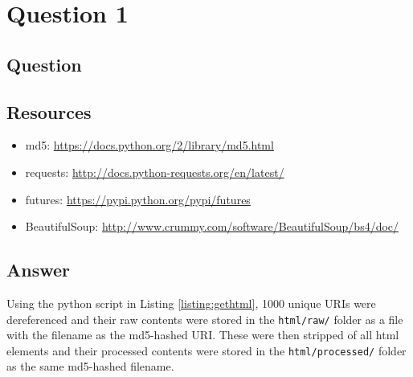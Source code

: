 \section{Question 1}

\subsection{Question}


\subsection{Resources}
\begin{itemize}
\item md5: \url{https://docs.python.org/2/library/md5.html}
\item requests: \url{http://docs.python-requests.org/en/latest/}
\item futures: \url{https://pypi.python.org/pypi/futures}
\item BeautifulSoup: \url{http://www.crummy.com/software/BeautifulSoup/bs4/doc/}
\end{itemize}

\subsection{Answer}
Using the python script in Listing \ref{listing:gethtml}, 1000 unique URIs were dereferenced and
their raw contents were stored in the {\tt html/raw/} folder as a file with the filename as the
md5-hashed URI. These were then stripped of all html elements and their processed contents were 
stored in the {\tt html/processed/} folder as the same md5-hashed filename.

\newpage
